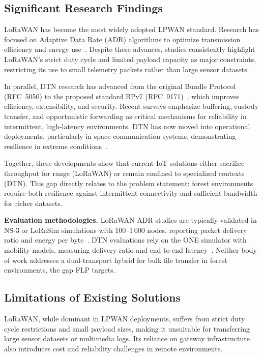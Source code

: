 \documentclass[conference]{IEEEtran}
\begin{document}
\subsection{Significant Research Findings}
\label{sec:findings}

LoRaWAN has become the most widely adopted LPWAN standard. Research has focused on Adaptive Data Rate (ADR) algorithms to optimize transmission efficiency and energy use~\cite{lehong2020adr}. Despite these advances, studies consistently highlight LoRaWAN's strict duty cycle and limited payload capacity as major constraints, restricting its use to small telemetry packets rather than large sensor datasets.

In parallel, DTN research has advanced from the original Bundle Protocol (RFC~5050) to the proposed standard BPv7 (RFC~9171)~\cite{burleigh2022bpv7}, which improves efficiency, extensibility, and security. Recent surveys emphasize buffering, custody transfer, and opportunistic forwarding as critical mechanisms for reliability in intermittent, high-latency environments. DTN has now moved into operational deployments, particularly in space communication systems, demonstrating resilience in extreme conditions~\cite{elewaily2024dtn}.

Together, these developments show that current IoT solutions either sacrifice throughput for range (LoRaWAN) or remain confined to specialized contexts (DTN). This gap directly relates to the problem statement: forest environments require both resilience against intermittent connectivity and sufficient bandwidth for richer datasets.

\textbf{Evaluation methodologies.} LoRaWAN ADR studies are typically validated in NS-3 or LoRaSim simulations with 100--1\,000 nodes, reporting packet delivery ratio and energy per byte~\cite{lehong2020adr}. DTN evaluations rely on the ONE simulator with mobility models, measuring delivery ratio and end-to-end latency~\cite{castillo2024dtn}. Neither body of work addresses a dual-transport hybrid for bulk file transfer in forest environments, the gap FLP targets.

\subsection{Limitations of Existing Solutions}

LoRaWAN, while dominant in LPWAN deployments, suffers from strict duty cycle restrictions and small payload sizes, making it unsuitable for transferring large sensor datasets or multimedia logs. Its reliance on gateway infrastructure also introduces cost and reliability challenges in remote environments.
\end{document}
